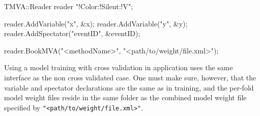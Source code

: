 \begin{codeexample}
\begin{tmvacode}
TMVA::Reader reader {"!Color:!Silent:!V"};

reader.AddVariable("x", &x);
reader.AddVariable("y", &y);
reader.AddSpectator("eventID", &eventID);

reader.BookMVA("<methodName>", "<path/to/weight/file.xml>");
\end{tmvacode}
\caption[.]{\codeexampleCaptionSize Using a model training with cross validation in application uses the same interface as the non cross validated case. One must make sure, however, that the variable and spectator declarations are the same as in training, and the per-fold model weight files reside in the same folder as the combined model weight file specified by \texttt{"<path/to/weight/file.xml>"}.}
\label{code:cv-application}
\end{codeexample}





















